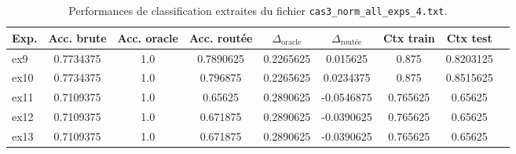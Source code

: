 \begin{table}[ht]
\centering
\small
\begin{tabular}{lcccccccc}
\hline
Exp.
&
Acc. brute
&
Acc. oracle
&
Acc. routée
&
$\Delta_{\mathrm{oracle}}$
&
$\Delta_{\mathrm{routée}}$
&
Ctx train
&
Ctx test
\\
\hline

ex9
&
0.7734375
&
1.0
&
0.7890625
&
0.2265625
&
0.015625
&
0.875
&
0.8203125
\\

ex10
&
0.7734375
&
1.0
&
0.796875
&
0.2265625
&
0.0234375
&
0.875
&
0.8515625
\\

ex11
&
0.7109375
&
1.0
&
0.65625
&
0.2890625
&
-0.0546875
&
0.765625
&
0.65625
\\

ex12
&
0.7109375
&
1.0
&
0.671875
&
0.2890625
&
-0.0390625
&
0.765625
&
0.65625
\\

ex13
&
0.7109375
&
1.0
&
0.671875
&
0.2890625
&
-0.0390625
&
0.765625
&
0.65625
\\

\hline
\end{tabular}
\caption{Performances de classification extraites du fichier
\texttt{cas3\_norm\_all\_exps\_4.txt}.}
\end{table}






























